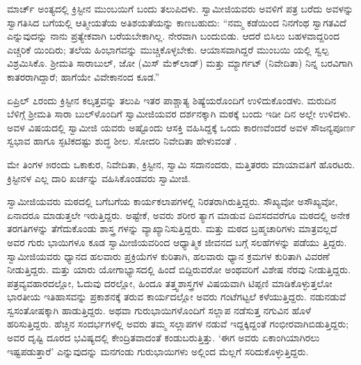 ಮಾರ್ಚ್ ಅಂತ್ಯದಲ್ಲಿ ಕ್ರಿಸ್ಟೀನ ಮುಂಬಯಿಗೆ ಬಂದು ತಲುಪಿದಳು. ಸ್ವಾಮೀಜಿಯವರು ಅವಳಿಗೆ ಪತ್ರ ಬರೆದು ಅವಳನ್ನು ಸ್ವಾಗತಿಸಿದ ಬಗೆಯಲ್ಲಿ ಆತ್ಮೀಯತೆಯ ಅತಿಶಯತೆಯನ್ನು ಕಾಣಬಹುದು: “ನಮ್ಮ ಕಡೆಯಿಂದ ನಿನಗೆಂಥ ಸ್ವಾಗತವಿದೆ ಎನ್ನುವುದನ್ನು ನಾನು ಪ್ರತ್ಯೇಕವಾಗಿ ಬರೆಯಬೇಕಾಗಿಲ್ಲ. ನೇರವಾಗಿ ಬಂದುಬಿಡು. ಆದರೆ ಬಿಸಿಲು ಬಹಳವಾದ್ದರಿಂದ ಎಚ್ಚರಿಕೆ ಯಿಂದಿರು; ತಲೆಯ ಹಿಂಭಾಗವನ್ನು ಮುಚ್ಚಿಕೊಳ್ಳಬೇಕು. ಆಯಾಸವಾಗಿದ್ದರೆ ಮುಂಬಯಿ ಯಲ್ಲಿ ಸ್ವಲ್ಪ ವಿಶ್ರಮಿಸಿಕೊ. ಶ್ರೀಮತಿ ಸಾರಾಬುಲ್, ಜೋ (ಮಿಸ್ ಮೆಕ್​ಲಾಡ್​) ಮತ್ತು ಮ್ಯಾರ್ಗಟ್ (ನಿವೇದಿತಾ) ನಿನ್ನ ಬರವಿಗಾಗಿ ಕಾತರರಾಗಿದ್ದಾರೆ; ಹಾಗೆಯೇ ವಿವೇಕಾನಂದ ಕೂಡ.”

ಏಪ್ರಿಲ್ ೭ರಂದು ಕ್ರಿಸ್ಟೀನ ಕಲ್ಕತ್ತವನ್ನು ತಲುಪಿ ಇತರ ಪಾಶ್ಚಾತ್ಯ ಶಿಷ್ಯೆಯರೊಂದಿಗೆ ಉಳಿದುಕೊಂಡಳು. ಮರುದಿನ ಬೆಳಿಗ್ಗೆ ಶ್ರೀಮತಿ ಸಾರಾ ಬುಲ್​ಳೊಂದಿಗೆ ಸ್ವಾಮೀಜಿಯವರ ದರ್ಶನಕ್ಕಾಗಿ ಮಠಕ್ಕೆ ಬಂದು ಇಡೀ ದಿನ ಅಲ್ಲೇ ಉಳಿದಳು. ಅವಳ ವಿಷಯದಲ್ಲಿ ಸ್ವಾಮೀಜಿ ಯವರು ಅಷ್ಟೊಂದು ಆಸಕ್ತಿ ವಹಿಸಿದ್ದಕ್ಕೆ ಒಂದು ಕಾರಣವೆಂದರೆ ಅವಳ ಸೌಜನ್ಯಪೂರ್ಣ ಸ್ವಭಾವ ಹಾಗೂ ಸ್ಫಟಿಕದಷ್ಟು ಶುದ್ಧ ಶೀಲ. ಸೋದರಿ ನಿವೇದಿತಾ ಹೇಳುವಂತೆ .

ಮೇ ತಿಂಗಳ ೫ರಂದು ಒಕಾಕುರ, ನಿವೇದಿತಾ, ಕ್ರಿಸ್ಟೀನ, ಸ್ವಾಮಿ ಸದಾನಂದರು, ಮತ್ತಿತರರು ಮಾಯಾವತಿಗೆ ಹೊರಟರು. ಕ್ರಿಸ್ಟೀನಳ ಎಲ್ಲ ದಾರಿ ಖರ್ಚನ್ನು ವಹಿಸಿಕೊಂಡವರು ಸ್ವಾಮೀಜಿ.

ಸ್ವಾಮೀಜಿಯವರು ಮಠದಲ್ಲಿ ಬಗೆಬಗೆಯ ಕಾರ್ಯಕಲಾಪಗಳಲ್ಲಿ ನಿರತರಾಗಿರುತ್ತಿದ್ದರು. ಸೌಖ್ಯವೋ ಅಸೌಖ್ಯವೋ, ಏನಾದರೂ ಮಾಡುತ್ತಲೇ ಇರುತ್ತಿದ್ದರು. ಅಷ್ಟೇಕೆ, ಅವರು ಶರೀರ ತ್ಯಾಗ ಮಾಡುವ ದಿವಸದವರೆಗೂ ಮಠದಲ್ಲಿ ಅನೇಕ ತರಗತಿಗಳನ್ನು ತೆಗೆದುಕೊಂಡು ಶಾಸ್ತ್ರ ಗಳನ್ನು ವ್ಯಾಖ್ಯಾನಿಸುತ್ತಿದ್ದರು. ಮತ್ತು ಮಠದ ಬ್ರಹ್ಮಚಾರಿಗಳು ಮಾತ್ರವಲ್ಲದೆ ಅವರ ಗುರು ಭಾಯಿಗಳೂ ಕೂಡ ಸ್ವಾಮೀಜಿಯವರಿಂದ ಆಧ್ಯಾತ್ಮಿಕ ಜೀವನದ ಬಗ್ಗೆ ಸಲಹೆಗಳನ್ನು ಪಡೆಯು ತ್ತಿದ್ದರು. ಸ್ವಾಮೀಜಿಯವರು ಧ್ಯಾನದ ಹಲವಾರು ಪ್ರಕ್ರಿಯೆಗಳ ಕುರಿತಾಗಿ, ಹಲವಾರು ಧ್ಯಾನ ಕ್ರಮಗಳ ಕುರಿತಾಗಿ ವಿವರಣೆ ನೀಡುತ್ತಿದ್ದರು. ಮತ್ತು ಯಾರು ಯೋಗಾಭ್ಯಾಸದಲ್ಲಿ ಹಿಂದೆ ಬಿದ್ದಿರುವರೋ ಅಂಥವರಿಗೆ ವಿಶೇಷ ನೆರವು ನೀಡುತ್ತಿದ್ದರು. ಪತ್ರವ್ಯವಹಾರದಲ್ಲೋ, ಓದುವು ದರಲ್ಲೋ, ಹಿಂದೂ ತತ್ತ್ವಶಾಸ್ತ್ರಗಳ ವಿಷಯವಾಗಿ ಟಿಪ್ಪಣಿ ಮಾಡಿಕೊಳ್ಳುತ್ತಲೋ ಭಾರತೀಯ ಇತಿಹಾಸವನ್ನು ಪ್ರಕಾಶನಕ್ಕೆ ತರುವ ಕಾರ್ಯದಲ್ಲೋ ಅವರು ಗಂಟೆಗಟ್ಟಲೆ ಕಳೆಯುತ್ತಿದ್ದರು. ನಡುನಡುವೆ ಸ್ವಸಂತೋಷಕ್ಕಾಗಿ ಹಾಡುತ್ತಿದ್ದರು. ಅಥವಾ ಗುರುಭಾಯಿಗಳೊಂದಿಗೆ ಸಲ್ಲಾಪ ನಡೆಸುತ್ತ ನಗುವಿನ ಹೊಳೆ ಹರಿಸುತ್ತಿದ್ದರು. ಹೆಚ್ಚಿನ ಸಂದರ್ಭಗಳಲ್ಲಿ ಅವರು ತಮ್ಮ ಸಲ್ಲಾಪಗಳ ನಡುವೆ ಇದ್ದಕ್ಕಿದ್ದಂತೆ ಗಂಭೀರವಾಗಿಬಿಡುತ್ತಿದ್ದರು; ಅವರ ದೃಷ್ಟಿ ದೂರದ ಭವಿಷ್ಯದಲ್ಲಿ ಕೇಂದ್ರಿತವಾದಂತೆ ಕಂಡುಬರುತ್ತಿತ್ತು. ‘ಈಗ ಅವರು ಏಕಾಂಗಿಯಾಗಿರಲು ಇಷ್ಟಪಡುತ್ತಾರೆ’ ಎನ್ನುವುದನ್ನು ಮನಗಂಡು ಗುರುಭಾಯಿಗಳು ಅಲ್ಲಿಂದ ಮೆಲ್ಲಗೆ ಸರಿದುಕೊಳ್ಳುತ್ತಿದ್ದರು.

